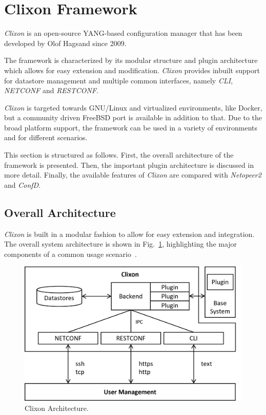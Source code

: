 \section{Clixon Framework}
\label{sec:clixon-framework}

\textit{Clixon} is an open-source YANG-based configuration manager that has been developed by Olof Hagsand since 2009. 

The framework is characterized by its modular structure and plugin architecture which allows for easy extension and modification. \textit{Clixon} provides inbuilt support for datastore management and multiple common interfaces, namely \textit{CLI}, \textit{NETCONF} and \textit{RESTCONF}. 

\textit{Clixon} is targeted towards GNU/Linux and virtualized environments, like Docker, but a community driven FreeBSD port is available in addition to that. Due to the broad platform support, the framework can be used in a variety of environments and for different scenarios.

This section is structured as follows. First, the overall architecture of the framework is presented. Then, the important plugin architecture is discussed in more detail. Finally, the available features of \textit{Clixon} are compared with \textit{Netopeer2} and \textit{ConfD}.

\subsection{Overall Architecture}

\textit{Clixon} is built in a modular fashion to allow for easy extension and integration. The overall system architecture is shown in Fig.~\ref{fig:architecture}, highlighting the major components of a common usage scenario~\cite{clixon-documentation, clixon-repo}.

\begin{figure}[htbp]
    \centering
    \includegraphics[width=\linewidth]{assets/3_ClixonFramework/Clixon_Architecture_v.png}
    \caption{Clixon Architecture.}
    \label{fig:architecture}
\end{figure}

